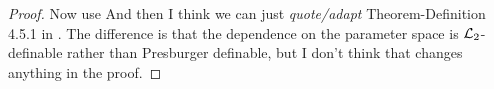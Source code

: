 \begin{proof}
Now use 
{\color{red} And then I think we can just \emph{quote/adapt} Theorem-Definition 4.5.1 in \cite{clu-loe-08}. The difference is that the dependence on the parameter space is $\mathcal{L}_2$-definable rather than Presburger definable, but I don't think that changes anything in the proof.}
\end{proof}

